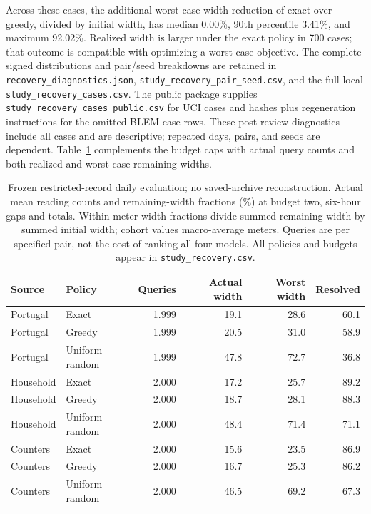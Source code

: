 \documentclass[12pt]{article}
\begin{document}
Across these cases, the additional worst-case-width reduction of exact
over greedy, divided by initial width, has median 0.00\%, 90th percentile
3.41\%, and maximum 92.02\%.
Realized width is larger under the exact policy in 700 cases;
that outcome is compatible with optimizing a worst-case objective.
The complete signed distributions and pair/seed breakdowns are retained in
\texttt{recovery\_diagnostics.json}, \texttt{study\_recovery\_pair\_seed.csv},
and the full local \texttt{study\_recovery\_cases.csv}. The public package
supplies \texttt{study\_recovery\_cases\_public.csv} for UCI cases and
hashes plus regeneration instructions for the omitted BLEM case rows.
These post-review diagnostics include
all cases and are descriptive; repeated days, pairs, and seeds are dependent.
Table~\ref{tab:actualrecovery} complements the budget caps with actual query
counts and both realized and worst-case remaining widths.
\begin{table}[htbp]
\centering\normalsize\setlength{\tabcolsep}{4pt}
\caption{Frozen restricted-record daily evaluation; no saved-archive reconstruction. Actual mean reading counts and remaining-width fractions (\%) at budget two, six-hour gaps and totals. Within-meter width fractions divide summed remaining width by summed initial width; cohort values macro-average meters. Queries are per specified pair, not the cost of ranking all four models. All policies and budgets appear in \texttt{study\_recovery.csv}.}
\label{tab:actualrecovery}
\begin{tabular}{llrrrr}
\toprule
Source & Policy & Queries & Actual width & Worst width & Resolved\\
\midrule
Portugal & Exact & 1.999 & 19.1 & 28.6 & 60.1\\
Portugal & Greedy & 1.999 & 20.5 & 31.0 & 58.9\\
Portugal & Uniform random & 1.999 & 47.8 & 72.7 & 36.8\\
Household & Exact & 2.000 & 17.2 & 25.7 & 89.2\\
Household & Greedy & 2.000 & 18.7 & 28.1 & 88.3\\
Household & Uniform random & 2.000 & 48.4 & 71.4 & 71.1\\
Counters & Exact & 2.000 & 15.6 & 23.5 & 86.9\\
Counters & Greedy & 2.000 & 16.7 & 25.3 & 86.2\\
Counters & Uniform random & 2.000 & 46.5 & 69.2 & 67.3\\
\bottomrule
\end{tabular}
\end{table}
\end{document}
